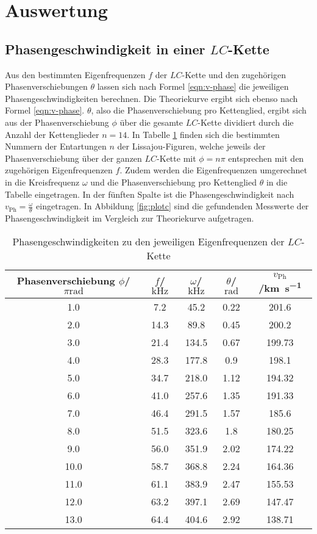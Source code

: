 \section{Auswertung}
\label{sec:Auswertung}

\subsection{Phasengeschwindigkeit in einer $LC$-Kette}

Aus den bestimmten Eigenfrequenzen $f$ der $LC$-Kette und den zugehörigen Phasenverschiebungen $\theta$ lassen sich nach Formel \eqref{eqn:v-phase} die jeweiligen Phasengeschwindigkeiten berechnen.
Die Theoriekurve ergibt sich ebenso nach Formel \eqref{eqn:v-phase}.
$\theta$, also die Phasenverschiebung pro Kettenglied, ergibt sich aus der Phasenverschiebung $\phi$ über die gesamte $LC$-Kette dividiert durch die Anzahl der Kettenglieder $n=14$.
In Tabelle \ref{tab:c} finden sich die bestimmten Nummern der Entartungen $n$ der Lissajou-Figuren, welche jeweils der Phasenverschiebung über der ganzen $LC$-Kette mit $\phi=n\pi$ entsprechen mit den zugehörigen Eigenfrequenzen $f$.
Zudem werden die Eigenfrequenzen umgerechnet in die Kreisfrequenz $\omega$ und die Phasenverschiebung pro Kettenglied $\theta$ in die Tabelle eingetragen.
In der fünften Spalte ist die Phasengeschwindigkeit nach $v_{\mathrm{Ph}}=\frac{\omega}{\theta}$ eingetragen.
In Abbildung \ref{fig:plotc} sind die gefundenden Messwerte der Phasengeschwindigkeit im Vergleich zur Theoriekurve aufgetragen.
\begin{table}
  \caption{Phasengeschwindigkeiten zu den jeweiligen Eigenfrequenzen der $LC$-Kette}
\label{tab:c}
\centering
\begin{tabular}{ccccc}
\toprule
Phasenverschiebung $\phi$/$\pi\si{\radian}$ & $f$/$\si{\kilo\Hz}$ & $\omega$/$\si{\kilo\Hz}$ & $\theta$/$\si{\radian}$ & $v_{\mathrm{Ph}}$/\si{\kilo\metre\per\second} \\
\midrule
1.0 & 7.2 & 45.2 & 0.22 & 201.6 \\
2.0 & 14.3 & 89.8 & 0.45 & 200.2 \\
3.0 & 21.4 & 134.5 & 0.67 & 199.73 \\
4.0 & 28.3 & 177.8 & 0.9 & 198.1 \\
5.0 & 34.7 & 218.0 & 1.12 & 194.32 \\
6.0 & 41.0 & 257.6 & 1.35 & 191.33 \\
7.0 & 46.4 & 291.5 & 1.57 & 185.6 \\
8.0 & 51.5 & 323.6 & 1.8 & 180.25 \\
9.0 & 56.0 & 351.9 & 2.02 & 174.22 \\
10.0 & 58.7 & 368.8 & 2.24 & 164.36 \\
11.0 & 61.1 & 383.9 & 2.47 & 155.53 \\
12.0 & 63.2 & 397.1 & 2.69 & 147.47 \\
13.0 & 64.4 & 404.6 & 2.92 & 138.71 \\
\bottomrule
\end{tabular}
\end{table}
